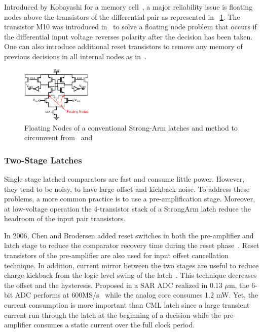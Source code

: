Introduced by Kobayashi for a memory cell~\cite{Kobayashi1993}, a major reliability issue is floating nodes above the transistors of the differential pair as represented in \figurename~\ref{fig:sa-fn}. The transistor M10 was introduced in~\cite{Montanaro1996} to solve a floating node problem that occurs if the differential input voltage reverses polarity after the decision has been taken. One can also introduce additional reset transistors to remove any memory of previous decisions in all internal nodes as in~\cite{Verbruggen2008}.

\begin{figure}[htp]
    \centering
    \includegraphics[width=0.3\textwidth]{Chapter7/Figs/StrongArm-FloatingNodes.ps}
    \caption{Floating Nodes of a conventional Strong-Arm latches and method to circumvent from~\cite{Montanaro1996} and~\cite{Verbruggen2008}}
    \label{fig:sa-fn}
\end{figure}

\subsubsection{Two-Stage Latches}
Single stage latched comparators are fast and consume little power. However, they tend to be noisy, to have large offset and kickback noise. To address these problems, a more common practice is to use a pre-amplification stage.
Moreover, at low-voltage operation the 4-transistor stack of a StrongArm latch reduce the headroom of the input pair transistors.

In 2006, Chen and Brodersen added reset switches in both the pre-amplifier and latch stage to reduce the comparator recovery time during the reset phase~\cite{Brodersen2006}. Reset transistors of the pre-amplifier are also used for input offset cancellation technique. In addition, current mirror between the two stages are useful to reduce charge kickback from the logic level swing of the latch~\cite{Bult1997}. This technique decreases the offset and the hysteresis. Proposed in a SAR ADC realized in 0.13 \(\mu\)m, the 6-bit ADC performs at 600MS/s~\cite{Brodersen2006} while the analog core consumes 1.2 mW. Yet, the current consumption is more important than CML latch since a large transient current run through the latch at the beginning of a decision while the pre-amplifier consumes a static current over the full clock period.

